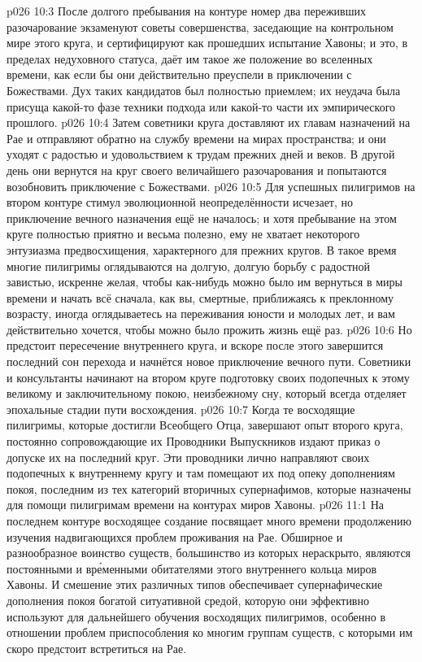 \vs p026 10:3 После долгого пребывания на контуре номер два переживших разочарование экзаменуют советы совершенства, заседающие на контрольном мире этого круга, и сертифицируют как прошедших испытание Хавоны; и это, в пределах недуховного статуса, даёт им такое же положение во вселенных времени, как если бы они действительно преуспели в приключении с Божествами. Дух таких кандидатов был полностью приемлем; их неудача была присуща какой\hyp{}то фазе техники подхода или какой\hyp{}то части их эмпирического прошлого.
\vs p026 10:4 Затем советники круга доставляют их главам назначений на Рае и отправляют обратно на службу времени на мирах пространства; и они уходят с радостью и удовольствием к трудам прежних дней и веков. В другой день они вернутся на круг своего величайшего разочарования и попытаются возобновить приключение с Божествами.
\vs p026 10:5 Для успешных пилигримов на втором контуре стимул эволюционной неопределённости исчезает, но приключение вечного назначения ещё не началось; и хотя пребывание на этом круге полностью приятно и весьма полезно, ему не хватает некоторого энтузиазма предвосхищения, характерного для прежних кругов. В такое время многие пилигримы оглядываются на долгую, долгую борьбу с радостной завистью, искренне желая, чтобы как\hyp{}нибудь можно было им вернуться в миры времени и начать всё сначала, как вы, смертные, приближаясь к преклонному возрасту, иногда оглядываетесь на переживания юности и молодых лет, и вам действительно хочется, чтобы можно было прожить жизнь ещё раз.
\vs p026 10:6 Но предстоит пересечение внутреннего круга, и вскоре после этого завершится последний сон перехода и начнётся новое приключение вечного пути. Советники и консультанты начинают на втором круге подготовку своих подопечных к этому великому и заключительному покою, неизбежному сну, который всегда отделяет эпохальные стадии пути восхождения.
\vs p026 10:7 Когда те восходящие пилигримы, которые достигли Всеобщего Отца, завершают опыт второго круга, постоянно сопровождающие их Проводники Выпускников издают приказ о допуске их на последний круг. Эти проводники лично направляют своих подопечных к внутреннему кругу и там помещают их под опеку дополнениям покоя, последним из тех категорий вторичных супернафимов, которые назначены для помощи пилигримам времени на контурах миров Хавоны.
\vs p026 11:1 На последнем контуре восходящее создание посвящает много времени продолжению изучения надвигающихся проблем проживания на Рае. Обширное и разнообразное воинство существ, большинство из которых нераскрыто, являются постоянными и вр\'еменными обитателями этого внутреннего кольца миров Хавоны. И смешение этих различных типов обеспечивает супернафические дополнения покоя богатой ситуативной средой, которую они эффективно используют для дальнейшего обучения восходящих пилигримов, особенно в отношении проблем приспособления ко многим группам существ, с которыми им скоро предстоит встретиться на Рае.
